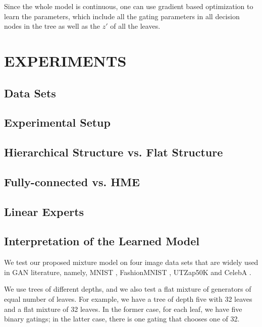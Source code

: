 \documentclass[a4paper,onesided,12pt]{report}
\begin{document}
Since the whole model is continuous, one can use gradient based optimization to learn the parameters, which include all the gating parameters in all decision nodes in the tree as well as the $z'$ of all the leaves.

\chapter{EXPERIMENTS}
\label{chapter:exps}

\section{Data Sets}
\label{sec:datasets}

\section{Experimental Setup}
\label{sec:setup}

\section{Hierarchical Structure vs. Flat Structure}
\label{sec:hme-vs-me}

\section{Fully-connected vs. HME}
\label{sec:fc-vs-hme}

\section{Linear Experts}
\label{sec:hme-linear}

\section{Interpretation of the Learned Model}
\label{sec:interpret}

We test our proposed mixture model on four image data sets that are widely used in GAN literature, namely, MNIST \cite{mnist}, FashionMNIST \cite{fashion}, UTZap50K \cite{utzap50k} and CelebA \cite{celeba}. 

We use trees of different depths, and we also test a flat mixture of generators of equal number of leaves. For example, we have a tree of depth five with 32 leaves and a flat mixture of 32 leaves. In the former case, for each leaf, we have five binary gatings; in the latter case, there is one gating that chooses one of 32. 
\end{document}

